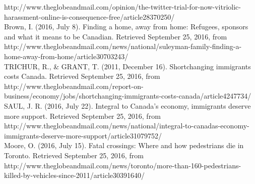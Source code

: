 \documentclass{article}
\begin{document}
http://www.theglobeandmail.com/opinion/the-twitter-trial-for-now-vitriolic-harassment-online-is-consequence-free/article28370250/\\
\noindent
[17] Brown, I. (2016, July 8). Finding a home, away from home: Refugees, sponsors and what it means to be Canadian. Retrieved September 25, 2016, from http://www.theglobeandmail.com/news/national/suleyman-family-finding-a-home-away-from-home/article30703243/\\
\noindent
[18] TRICHUR, R., \& GRANT, T. (2011, December 16). Shortchanging immigrants costs Canada. Retrieved September 25, 2016, from http://www.theglobeandmail.com/report-on-business/economy/jobs/shortchanging-immigrants-costs-canada/article4247734/\\
\noindent
[19] SAUL, J. R. (2016, July 22). Integral to Canada's economy, immigrants deserve more support. Retrieved September 25, 2016, from \\
http://www.theglobeandmail.com/news/national/integral-to-canadas-economy-immigrants-deserve-more-support/article31079752/\\
\noindent
[20] Moore, O. (2016, July 15). Fatal crossings: Where and how pedestrians die in Toronto. Retrieved September 25, 2016, from \\
http://www.theglobeandmail.com/news/toronto/more-than-160-pedestrians-killed-by-vehicles-since-2011/article30391640/
\end{document}
